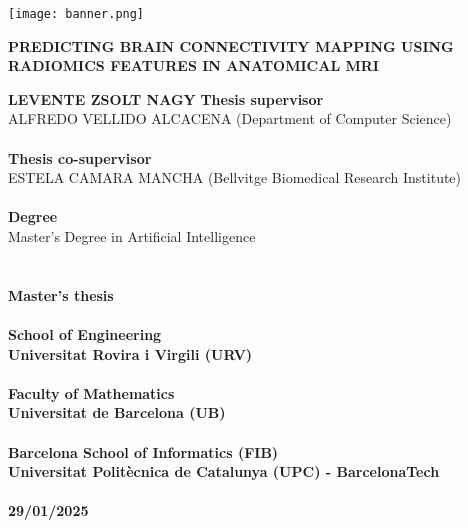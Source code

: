 \begin{titlepage}
    \begin{center}
        \begingroup
          \let\clearpage\relax
          \texttt{[image: banner.png]}
          \vfill
          \LARGE
          \begin{center}
          \textbf{\MakeUppercase{Predicting Brain Connectivity Mapping Using Radiomics Features in Anatomical MRI}}
          \end{center}
          \vfill
          \large
          \textbf{\MakeUppercase{Levente Zsolt Nagy}}
          \vfill
          \normalsize
          \textbf{Thesis supervisor}\\
          \MakeUppercase{Alfredo Vellido Alcacena} (Department of Computer Science)\\
          \hfill\\
          \textbf{Thesis co-supervisor}\\
          \MakeUppercase{Estela Camara Mancha} (Bellvitge Biomedical Research Institute)\\
          \hfill\\
          \textbf{Degree}\\
          Master's Degree in Artificial Intelligence\\
          \hfill\\\hfill\\
          \textbf{Master's thesis}\\
          \hfill\\
          \textbf{School of Engineering}\\
          \textbf{Universitat Rovira i Virgili (URV)}\\
          \hfill\\
          \textbf{Faculty of Mathematics}\\
          \textbf{Universitat de Barcelona (UB)}\\
          \hfill\\
          \textbf{Barcelona School of Informatics (FIB)}\\
          \textbf{Universitat Politècnica de Catalunya (UPC) - BarcelonaTech}\\
          \hfill\\
          \textbf{29/01/2025}\\
        \endgroup
    \end{center}
\end{titlepage}